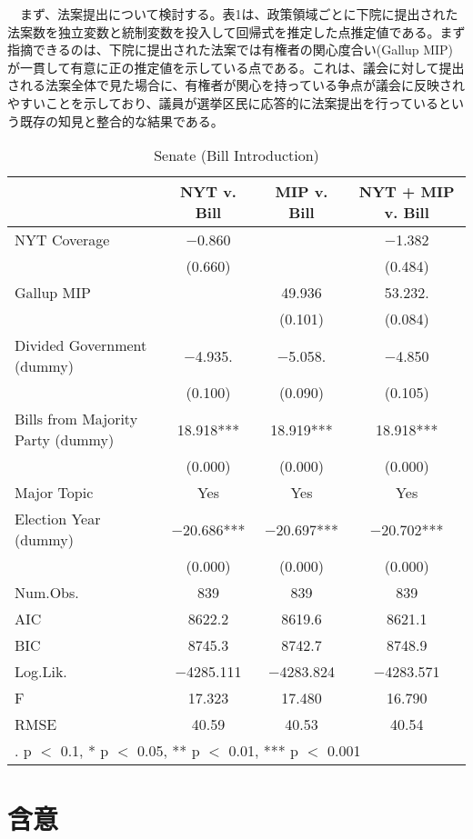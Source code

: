 \documentclass[here]{article}
\begin{document}
　まず、法案提出について検討する。表1は、政策領域ごとに下院に提出された法案数を独立変数と統制変数を投入して回帰式を推定した点推定値である。まず指摘できるのは、下院に提出された法案では有権者の関心度合い(Gallup MIP)が一貫して有意に正の推定値を示している点である。これは、議会に対して提出される法案全体で見た場合に、有権者が関心を持っている争点が議会に反映されやすいことを示しており、議員が選挙区民に応答的に法案提出を行っているという既存の知見と整合的な結果である。\citep*{Page1983-bx,Monroe1998-ty,Burstein2003-vs}\\

\begin{table}[htbp]

  \caption{Senate (Bill Introduction)}
  \centering
  \begin{tabular}[t]{lccc}
  \toprule
    & NYT v. Bill & MIP v. Bill & NYT + MIP v. Bill\\
  \midrule
  NYT Coverage & \num{-0.860} &  & \num{-1.382}\\
   & (\num{0.660}) &  & (\num{0.484})\\
  Gallup MIP &  & \num{49.936} & \num{53.232}.\\
   &  & (\num{0.101}) & (\num{0.084})\\
  Divided Government (dummy) & \num{-4.935}. & \num{-5.058}. & \num{-4.850}\\
   & (\num{0.100}) & (\num{0.090}) & (\num{0.105})\\
  Bills from Majority Party (dummy) & \num{18.918}*** & \num{18.919}*** & \num{18.918}***\\
   & (\num{0.000}) & (\num{0.000}) & \vphantom{1} (\num{0.000})\\
  Major Topic & Yes & Yes & Yes\\
  Election Year (dummy) & \num{-20.686}*** & \num{-20.697}*** & \num{-20.702}***\\
   & (\num{0.000}) & (\num{0.000}) & (\num{0.000})\\
  Num.Obs. & \num{839} & \num{839} & \num{839}\\
  \midrule
  AIC & \num{8622.2} & \num{8619.6} & \num{8621.1}\\
  BIC & \num{8745.3} & \num{8742.7} & \num{8748.9}\\
  Log.Lik. & \num{-4285.111} & \num{-4283.824} & \num{-4283.571}\\
  F & \num{17.323} & \num{17.480} & \num{16.790}\\
  RMSE & \num{40.59} & \num{40.53} & \num{40.54}\\
  \bottomrule
  \multicolumn{4}{l}{\rule{0pt}{1em}. p $<$ 0.1, * p $<$ 0.05, ** p $<$ 0.01, *** p $<$ 0.001}\\
  \end{tabular}

\end{table}



\section{含意}

\newpage

\end{document}
